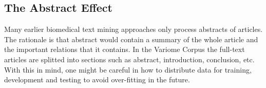 \subsection{The Abstract Effect}
Many earlier biomedical text mining approaches only process abstracts of articles. The rationale is that abstract would contain a summary of the whole article and the important relations that it contains. In the Variome Corpus the full-text articles are splitted into sections such as abstract, introduction, conclusion, etc. With this in mind, one might be careful in how to distribute data for training, development and testing to avoid over-fitting in the future.
